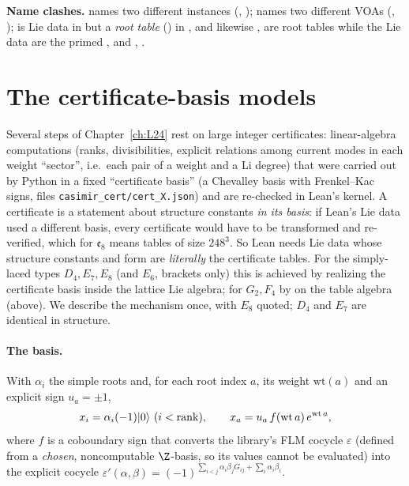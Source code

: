 \begin{warning}[title={Trap: Coexisting models and clashing names}]
\textbf{Name clashes.}  names two different instances (, );  names
two different VOAs (, );  is Lie data in  but a \emph{root table}
() in , and likewise ,  are root tables while the Lie data are the primed
,  and , .
\end{warning}

\section{The certificate-basis models}\label{l23:sec:cert}

Several steps of Chapter~\ref{ch:L24} rest on large integer certificates: linear-algebra computations (ranks, divisibilities, explicit
relations among current modes in each weight ``sector'', i.e.\ each pair of a weight and a Li degree) that were carried out by Python in a
fixed ``certificate basis'' (a Chevalley basis with Frenkel--Kac signs, files \texttt{casimir\_cert/cert\_X.json}) and are re-checked in
Lean's kernel. A certificate is a statement about structure constants \emph{in its basis}: if Lean's Lie data used a different basis, every
certificate would have to be transformed and re-verified, which for $\mathfrak e_8$ means tables of size $248^3$. So Lean needs Lie data
whose structure constants and form are \emph{literally} the certificate tables. For the simply-laced types $D_4,E_7,E_8$ (and $E_6$, brackets only) this is achieved by realizing
the certificate basis inside the lattice Lie algebra; for $G_2,F_4$ by  on the table algebra (above). We describe the
mechanism once, with $E_8$ quoted; $D_4$ and $E_7$ are identical in structure.

\paragraph{The basis.} With $\alpha_i$ the simple roots and, for each root index $a$, its weight $\mathrm{wt}(a)$ and an explicit sign $u_a=\pm1$,
\begin{equation*}
x_i=\alpha_i(-1)\lxxiiivac\ (i<\mathrm{rank}),\qquad x_a=u_a\,f(\mathrm{wt}\,a)\,e^{\mathrm{wt}\,a},
\end{equation*}
where $f$ is a coboundary sign that converts the library's FLM cocycle $\varepsilon$ (defined from a \emph{chosen}, noncomputable
$\Z$-basis, so its values cannot be evaluated) into the explicit cocycle $\varepsilon'(\alpha,\beta)=(-1)^{\sum_{i<j}\alpha_i\beta_jG_{ij}+\sum_i\alpha_i\beta_i}$.

